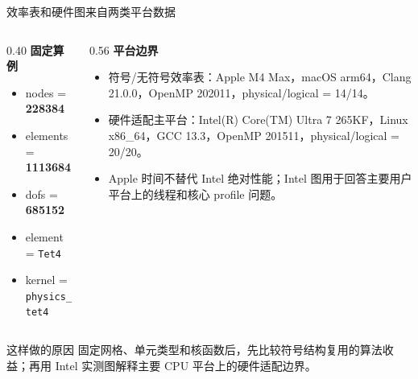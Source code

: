 \documentclass[UTF8,aspectratio=169,10pt]{ctexbeamer}
\newcommand{\metric}[1]{\textcolor{pgsaGreen}{\textbf{#1}}}
\begin{document}
\begin{frame}{效率表和硬件图来自两类平台数据}
\begin{columns}[T,onlytextwidth]
\begin{column}{0.40\textwidth}
\textbf{固定算例}
\begin{itemize}
  \item nodes = \metric{228384}
  \item elements = \metric{1113684}
  \item dofs = \metric{685152}
  \item element = \texttt{Tet4}
  \item kernel = \texttt{physics\_tet4}
\end{itemize}
\end{column}
\begin{column}{0.56\textwidth}
\textbf{平台边界}
\begin{itemize}
  \item 符号/无符号效率表：Apple M4 Max，macOS arm64，Clang 21.0.0，OpenMP 202011，physical/logical = 14/14。
  \item 硬件适配主平台：Intel(R) Core(TM) Ultra 7 265KF，Linux x86\_64，GCC 13.3，OpenMP 201511，physical/logical = 20/20。
  \item Apple 时间不替代 Intel 绝对性能；Intel 图用于回答主要用户平台上的线程和核心 profile 问题。
\end{itemize}
\end{column}
\end{columns}
\begin{block}{这样做的原因}
固定网格、单元类型和核函数后，先比较符号结构复用的算法收益；再用 Intel 实测图解释主要 CPU 平台上的硬件适配边界。
\end{block}
\end{frame}
\end{document}
